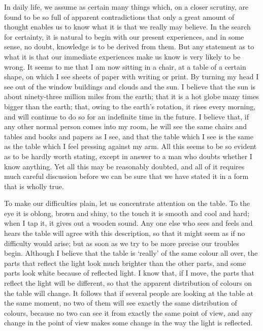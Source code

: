 \documentclass[oneside,letterpaper,12pt]{book}
\begin{document}
In daily life, we assume as certain many things which, on a closer
scrutiny, are found to be so full of apparent contradictions that only a
great amount of thought enables us to know what it is that we really may
believe. In the search for certainty, it is natural to begin with our
present experiences, and in some sense, no doubt, knowledge is to be
derived from them. But any statement as to what it is that our immediate
experiences make us know is very likely to be wrong. It seems to me that
I am now sitting in a chair, at a table of a certain shape, on which I
see sheets of paper with writing or print. By turning my head I see out
of the window buildings and clouds and the sun. I believe that the sun
is about ninety-three million miles from the earth; that it is a hot
globe many times bigger than the earth; that, owing to the
earth's rotation, it rises every morning, and will
continue to do so for an indefinite time in the future. I believe that,
if any other normal person comes into my room, he will see the same
chairs and tables and books and papers as I see, and that the table
which I see is the same as the table which I feel pressing against my
arm. All this seems to be so evident as to be hardly worth stating,
except in answer to a man who doubts whether I know anything. Yet all
this may be reasonably doubted, and all of it requires much careful
discussion before we can be sure that we have stated it in a form that
is wholly true.

To make our difficulties plain, let us concentrate attention on the
table. To the eye it is oblong, brown and shiny, to the touch it is
smooth and cool and hard; when I tap it, it gives out a wooden sound.
Any one else who sees and feels and hears the table will agree with this
description, so that it might seem as if no difficulty would arise; but
as soon as we try to be more precise our troubles begin. Although I
believe that the table is `really' of
the same colour all over, the parts that reflect the light look much
brighter than the other parts, and some parts look white because of
reflected light. I know that, if I move, the parts that reflect the
light will be different, so that the apparent distribution of colours on
the table will change. It follows that if several people are looking at
the table at the same moment, no two of them will see exactly the same
distribution of colours, because no two can see it from exactly the same
point of view, and any change in the point of view makes some change in
the way the light is reflected.
\end{document}
